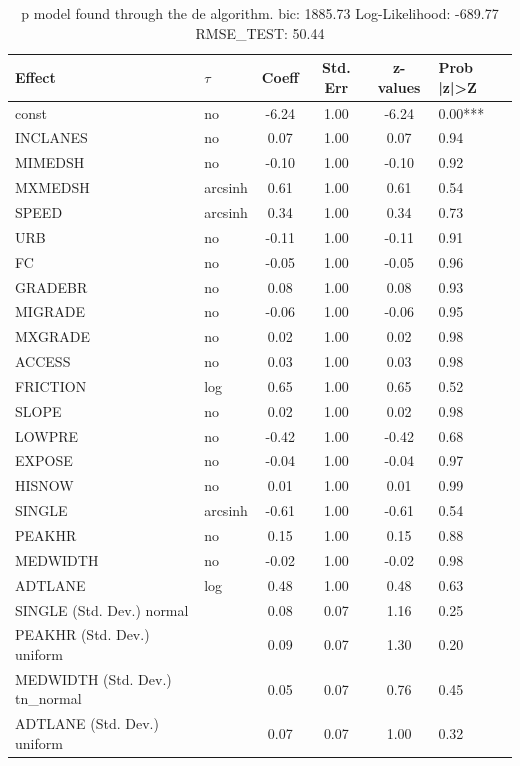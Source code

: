 \begin{table}
	\caption{p model found through the de algorithm. bic: 1885.73 Log-Likelihood: -689.77 RMSE_TEST: 50.44}
	\begin{center}
		\begin{tabular}{|l|l|c|c|c|l|}
			\hline
			Effect & $\tau$ & Coeff & Std. Err & z-values & Prob |z|>Z \\
			\hline
			const & no & -6.24 & 1.00 & -6.24 & 0.00*** \\
			\hline
			INCLANES & no & 0.07 & 1.00 & 0.07 & 0.94 \\
			\hline
			MIMEDSH & no & -0.10 & 1.00 & -0.10 & 0.92 \\
			\hline
			MXMEDSH & arcsinh & 0.61 & 1.00 & 0.61 & 0.54 \\
			\hline
			SPEED & arcsinh & 0.34 & 1.00 & 0.34 & 0.73 \\
			\hline
			URB & no & -0.11 & 1.00 & -0.11 & 0.91 \\
			\hline
			FC & no & -0.05 & 1.00 & -0.05 & 0.96 \\
			\hline
			GRADEBR & no & 0.08 & 1.00 & 0.08 & 0.93 \\
			\hline
			MIGRADE & no & -0.06 & 1.00 & -0.06 & 0.95 \\
			\hline
			MXGRADE & no & 0.02 & 1.00 & 0.02 & 0.98 \\
			\hline
			ACCESS & no & 0.03 & 1.00 & 0.03 & 0.98 \\
			\hline
			FRICTION & log & 0.65 & 1.00 & 0.65 & 0.52 \\
			\hline
			SLOPE & no & 0.02 & 1.00 & 0.02 & 0.98 \\
			\hline
			LOWPRE & no & -0.42 & 1.00 & -0.42 & 0.68 \\
			\hline
			EXPOSE & no & -0.04 & 1.00 & -0.04 & 0.97 \\
			\hline
			HISNOW & no & 0.01 & 1.00 & 0.01 & 0.99 \\
			\hline
			SINGLE & arcsinh & -0.61 & 1.00 & -0.61 & 0.54 \\
			\hline
			PEAKHR & no & 0.15 & 1.00 & 0.15 & 0.88 \\
			\hline
			MEDWIDTH & no & -0.02 & 1.00 & -0.02 & 0.98 \\
			\hline
			ADTLANE & log & 0.48 & 1.00 & 0.48 & 0.63 \\
			\hline
			SINGLE (Std. Dev.) normal &  & 0.08 & 0.07 & 1.16 & 0.25 \\
			\hline
			PEAKHR (Std. Dev.) uniform &  & 0.09 & 0.07 & 1.30 & 0.20 \\
			\hline
			MEDWIDTH (Std. Dev.) tn_normal &  & 0.05 & 0.07 & 0.76 & 0.45 \\
			\hline
			ADTLANE (Std. Dev.) uniform &  & 0.07 & 0.07 & 1.00 & 0.32 \\
			\hline
		\end{tabular}
	\end{center}
\end{table}